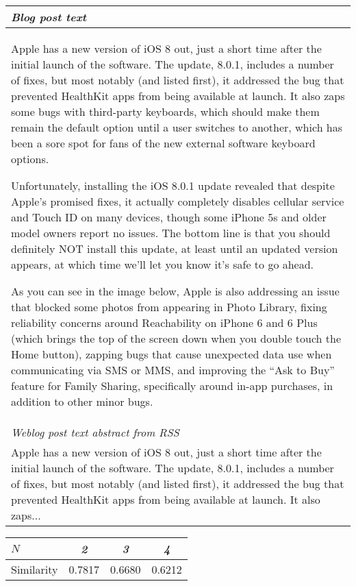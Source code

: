 \begin{table}
{\begin{tabular}{@{}p{12cm}@{}} \toprule
\emph{Blog post text} \\ \hline
Apple has a new version of iOS 8 out, just a short time after the 
initial launch of the software. The update, 8.0.1, includes a number of 
fixes, but most notably (and listed first), it addressed the bug that 
prevented HealthKit apps from being available at launch. It also zaps 
some bugs with third-party keyboards, which should make them remain the 
default option until a user switches to another, which has been a sore 
spot for fans of the new external software keyboard options.

Unfortunately, installing the iOS 8.0.1 update revealed that despite 
Apple’s promised fixes, it actually completely disables cellular service 
and Touch ID on many devices, though some iPhone 5s and older model 
owners report no issues. The bottom line is that you should definitely 
NOT install this update, at least until an updated version appears, 
at which time we’ll let you know it’s safe to go ahead.

As you can see in the image below, Apple is also addressing an issue that 
blocked some photos from appearing in Photo Library, fixing reliability 
concerns around Reachability on iPhone 6 and 6 Plus (which brings the top 
of the screen down when you double touch the Home button), zapping bugs 
that cause unexpected data use when communicating via SMS or MMS, and 
improving the “Ask to Buy” feature for Family Sharing, specifically 
around in-app purchases, in addition to other minor bugs.\\ \hline

\emph{Weblog post text abstract from RSS} \\ \hline
Apple has a new version of iOS 8 out, just a short time after the 
initial launch of the software. The update, 8.0.1, includes a number of 
fixes, but most notably (and listed first), it addressed the bug that 
prevented HealthKit apps from being available at launch. It also zaps... \\ \hline
\end{tabular}}
\label{table:techcrunch}
\end{table}

\begin{table}
{\begin{tabular}{@{}lccc@{}} \toprule
        \emph{$N$} & \emph{2} & \emph{3} & \emph{4} \\ \hline
Similarity & 0.7817 & 0.6680 & 0.6212 \\ \hline
\end{tabular}}
\label{table:similarity-n-values}
\end{table}

